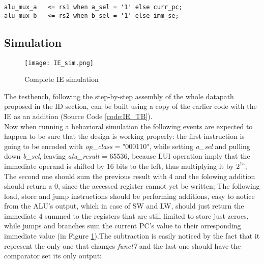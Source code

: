 \begin{verbatim}
alu_mux_a   <= rs1 when a_sel = '1' else curr_pc;
alu_mux_b   <= rs2 when b_sel = '1' else imm_se;
\end{verbatim}

\subsection{Simulation}

\begin{figure}[ht]
    \centering
    \texttt{[image: IE\_sim.png]}
    \caption{Complete IE simulation}
    \label{fig:IE_sim}
\end{figure}

The testbench, following the step-by-step assembly of the whole datapath proposed in the ID section, can be built using a copy of the earlier code with the IE as an addition (Source Code \ref{code:IE_TB}).\\
Now when running a behavioral simulation the following events are expected to happen to be sure that the design is working properly: the first instruction is going to be encoded with \emph{op{\_}class} = "000110", while setting \emph{a{\_}sel} and pulling down \emph{b{\_}sel}, leaving \emph{alu{\_}result} = 65536, because LUI operation imply that the immediate operand is shifted by 16 bits to the left, thus multiplying it by $2^{15}$; The second one should sum the previous result with 4 and the folowing addition should return a 0, since the accessed register cannot yet be written; The following load, store and jump instructions should be performing additions, easy to notice from the ALU's output, which in case of SW and LW, should just return the immediate 4 summed to the registers that are still limited to store just zeroes, while jumps and branches sum the current PC's value to their orresponding immediate value (in Figure \ref{fig:IE_sim}).The subtraction is easily noticed by the fact that it represent the only one that changes \emph{funct7} and the last one should have the comparator set its only output:\\

